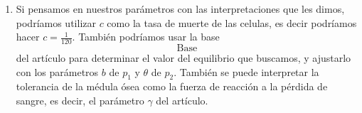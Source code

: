 \begin{solucion}
\begin{enumerate}
  Además, el modelo del artículo está construido para tener un solo equilibrio estable (\emph{Base}), al que
  la población siempre regresa mientras que en nuestro modelo vimos que la población puede quedarse
  oscilando o incluso comportarse de forma caótica.

  \item Si pensamos en nuestros parámetros con las interpretaciones que les dimos, podríamos utilizar $c$ como
    la tasa de muerte de las celulas, es decir podríamos hacer $c = \frac{1}{120}$. También podríamos usar
    la base $$\text{Base}$$ del artículo para determinar el valor del equilibrio que buscamos, y ajustarlo
    con los parámetros $b$ de $p_1$ y $\theta$ de $p_2$. También se puede interpretar la tolerancia de
    la médula ósea como la fuerza de reacción a la pérdida de sangre, es decir, el parámetro $\gamma$ del artículo.
\end{enumerate}
\end{solucion}
